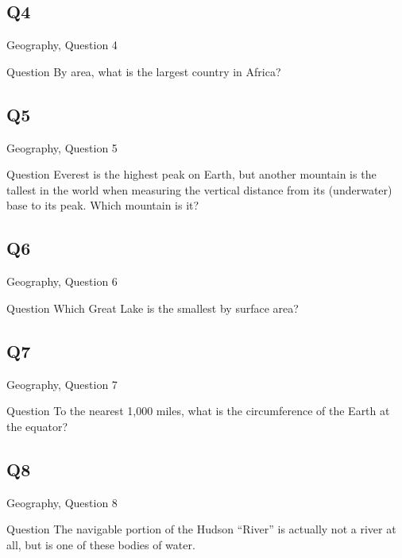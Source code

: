 \documentclass[11pt]{beamer}
\begin{document}
\subsection*{Q4}
\begin{frame}[t]{Geography, Question 4}
\begin{block}{Question}
By area, what is the largest country in Africa?
\end{block}
\end{frame}
\subsection*{Q5}
\begin{frame}[t]{Geography, Question 5}
\begin{block}{Question}
Everest is the highest peak on Earth, but another mountain is the tallest in the world when measuring the vertical distance from its (underwater) base to its peak. Which mountain is it?
\end{block}
\end{frame}
\subsection*{Q6}
\begin{frame}[t]{Geography, Question 6}
\begin{block}{Question}
Which Great Lake is the smallest by surface area?
\end{block}
\end{frame}
\subsection*{Q7}
\begin{frame}[t]{Geography, Question 7}
\begin{block}{Question}
To the nearest 1,000 miles, what is the circumference of the Earth at the equator?
\end{block}
\end{frame}
\subsection*{Q8}
\begin{frame}[t]{Geography, Question 8}
\begin{block}{Question}
The navigable portion of the Hudson ``River'' is actually not a river at all, but is one of these bodies of water.
\end{block}
\end{frame}
\end{document}
